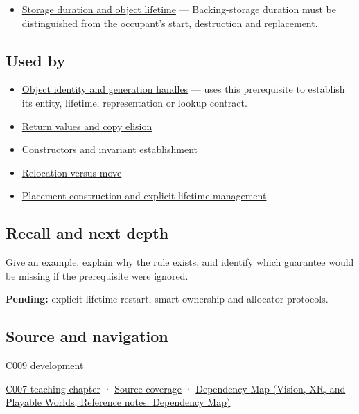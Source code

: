 \hypertarget{appendix-a82f9c438857-prerequisites}{}

\begin{itemize}
\tightlist
\item
  \hyperref[appendix-0b104bcba06b]{Storage duration and object lifetime} --- Backing-storage duration must be distinguished from the occupant's start, destruction and replacement.
\end{itemize}

\subsection{Used by}\label{appendix-a82f9c438857-used-by}

\hypertarget{appendix-a82f9c438857-used-by}{}

\begin{itemize}
\tightlist
\item
  \hyperref[appendix-f1581457d322]{Object identity and generation handles} --- uses this prerequisite to establish its entity, lifetime, representation or lookup contract.
\item
  \hyperref[appendix-b08d3788c5c6]{Return values and copy elision}
\item
  \hyperref[appendix-7f8ec83d0886]{Constructors and invariant establishment}
\item
  \hyperref[appendix-adfd6397af8d]{Relocation versus move}
\item
  \hyperref[appendix-f56c3e43fd4e]{Placement construction and explicit lifetime management}
\end{itemize}

\subsection{Recall and next depth}\label{appendix-a82f9c438857-recall-and-next-depth}

\hypertarget{appendix-a82f9c438857-recall-and-next-depth}{}

Give an example, explain why the rule exists, and identify which guarantee would be missing if the prerequisite were ignored.

\textbf{Pending:} explicit lifetime restart, smart ownership and allocator protocols.

\subsection{Source and navigation}\label{appendix-a82f9c438857-source-and-navigation}

\hypertarget{appendix-a82f9c438857-source-and-navigation}{}

\hyperref[appendix-fd090d982a15-m009---parts-127-147]{C009 development}

\hyperref[01-foundations-i-ch002-storage-is-a-place-an-object-is-its-occupant]{C007 teaching chapter} · \hyperref[appendix-fd090d982a15-m007---parts-101-112]{Source coverage} · \href{../07-Vision-XR-and-Playable-Worlds/main.pdf\#nameddest=appendix-4ad47bdd269a}{Dependency Map (Vision, XR, and Playable Worlds, Reference notes: Dependency Map)}
